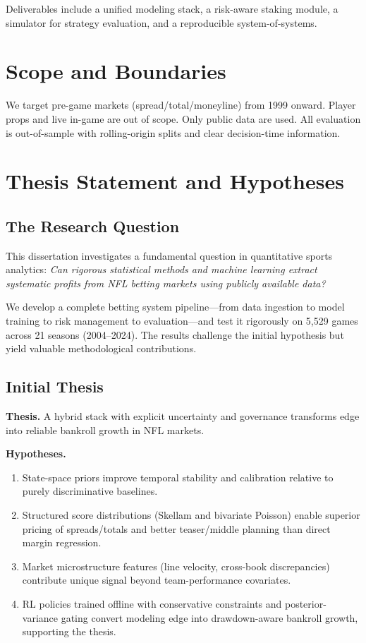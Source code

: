 \noindent Deliverables include a unified modeling stack, a risk-aware staking module, a simulator for strategy evaluation, and a reproducible system-of-systems.


\section{Scope and Boundaries}
We target pre-game markets (spread/total/moneyline) from 1999 onward. Player props and live in-game are out of scope. Only public data are used. All evaluation is out-of-sample with rolling-origin splits and clear decision-time information.

\section{Thesis Statement and Hypotheses}

\subsection{The Research Question}

This dissertation investigates a fundamental question in quantitative sports analytics: \textit{Can rigorous statistical methods and machine learning extract systematic profits from NFL betting markets using publicly available data?}

We develop a complete betting system pipeline—from data ingestion to model training to risk management to evaluation—and test it rigorously on 5,529 games across 21 seasons (2004--2024). The results challenge the initial hypothesis but yield valuable methodological contributions.

\subsection{Initial Thesis}
\textbf{Thesis.} A hybrid stack with explicit uncertainty and governance transforms edge into reliable bankroll growth in NFL markets.

\textbf{Hypotheses.}
\begin{enumerate}
  \item State-space priors improve temporal stability and calibration relative to purely discriminative baselines.
  \item Structured score distributions (Skellam and bivariate Poisson) enable superior pricing of spreads/totals and better teaser/middle planning than direct margin regression.
  \item Market microstructure features (line velocity, cross-book discrepancies) contribute unique signal beyond team-performance covariates.
  \item RL policies trained offline with conservative constraints and posterior-variance gating convert modeling edge into drawdown-aware bankroll growth, supporting the thesis.
\end{enumerate}

